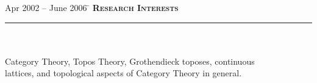 \documentclass[11pt,a4paper]{article}
\begin{document}
\begin{tabbing} 
Apr 2002 -- June 2006 \=\kill
\> \textbf{\Large{\textsc{Research Interests}}}\\
\> \noindent\rule{11cm}{1pt}\\
\\
\> Category Theory, Topos Theory, Grothendieck toposes, continuous \\ 
\> lattices, and topological aspects of Category Theory in general. \\
\end{tabbing}
\end{document}

